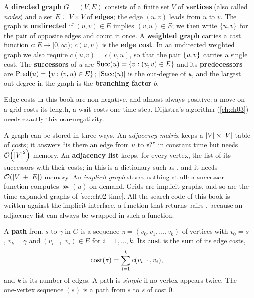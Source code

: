 \begin{definition}
\label{def:ch02-graph}
A \textbf{directed graph} $G=(V,E)$ consists of a finite set $V$ of \textbf{vertices} (also called \emph{nodes}) and a set $E\subseteq V\times V$ of \textbf{edges}; the edge $(u,v)$ leads from $u$ to $v$. The graph is \textbf{undirected} if $(u,v)\in E$ implies $(v,u)\in E$; we then write $\left\{ u,v \right\}$ for the pair of opposite edges and count it once. A \textbf{weighted graph} carries a cost function $c\colon E\to[0,\infty)$; $c(u,v)$ is the \textbf{edge cost}. In an undirected weighted graph we also require $c(u,v)=c(v,u)$, so that the pair $\left\{ u,v \right\}$ carries a single cost. The \textbf{successors} of $u$ are $\operatorname{Succ}(u)=\left\{ v : (u,v)\in E \right\}$ and its \textbf{predecessors} are $\operatorname{Pred}(u)=\left\{ v : (v,u)\in E \right\}$; $\left\lvert \operatorname{Succ}(u) \right\rvert$ is the out-degree of $u$, and the largest out-degree in the graph is the \textbf{branching factor} $b$.
\end{definition}

Edge costs in this book are non-negative, and almost always positive: a move on a grid costs its length, a wait costs one time step. Dijkstra's algorithm (\cref{ch:ch03}) needs exactly this non-negativity.

A graph can be stored in three ways. An \emph{adjacency matrix} keeps a $\left\lvert V \right\rvert\times\left\lvert V \right\rvert$ table of costs; it answers ``is there an edge from $u$ to $v$?'' in constant time but needs $\mathcal{O}\!\left(\left\lvert V \right\rvert^2\right)$ memory. An \textbf{adjacency list} keeps, for every vertex, the list of its successors with their costs; in \python this is a dictionary such as , and it needs $\mathcal{O}\!\left(\left\lvert V \right\rvert+\left\lvert E \right\rvert\right)$ memory. An \emph{implicit graph} stores nothing at all: a successor function computes $\Succ(u)$ on demand. Grids are implicit graphs, and so are the time-expanded graphs of \cref{sec:ch02-time}. All the search code of this book is written against the implicit interface, a function  that returns pairs , because an adjacency list can always be wrapped in such a function.

\begin{definition}
\label{def:ch02-path}
A \textbf{path} from $s$ to $\gamma$ in $G$ is a sequence $\pi=(v_0,v_1,\dots,v_k)$ of vertices with $v_0=s$, $v_k=\gamma$ and $(v_{i-1},v_i)\in E$ for $i=1,\dots,k$. Its \textbf{cost} is the sum of its edge costs,
\begin{equation}
\operatorname{cost}(\pi)=\sum_{i=1}^{k} c(v_{i-1},v_i),
\label{eq:ch02-path-cost}
\end{equation}
and $k$ is its number of edges. A path is \emph{simple} if no vertex appears twice. The one-vertex sequence $(s)$ is a path from $s$ to $s$ of cost $0$.
\end{definition}


